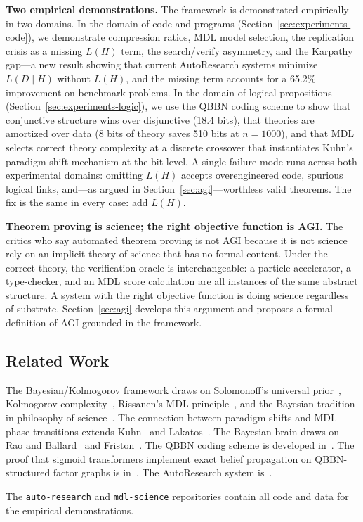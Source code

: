 \textbf{Two empirical demonstrations.} The framework is demonstrated
empirically in two domains. In the domain of code and programs
(Section~\ref{sec:experiments-code}), we demonstrate compression
ratios, MDL model selection, the replication crisis as a missing
$L(H)$ term, the search/verify asymmetry, and the Karpathy gap---a
new result showing that current AutoResearch systems minimize
$L(D \mid H)$ without $L(H)$, and the missing term accounts for a
65.2\% improvement on benchmark problems. In the domain of logical
propositions (Section~\ref{sec:experiments-logic}), we use the QBBN
coding scheme to show that conjunctive structure wins over disjunctive
(18.4 bits), that theories are amortized over data (8 bits of theory
saves 510 bits at $n = 1000$), and that MDL selects correct theory
complexity at a discrete crossover that instantiates Kuhn's paradigm
shift mechanism at the bit level. A single failure mode runs across
both experimental domains: omitting $L(H)$ accepts overengineered
code, spurious logical links, and---as argued in
Section~\ref{sec:agi}---worthless valid theorems. The fix is the same
in every case: add $L(H)$.

\textbf{Theorem proving is science; the right objective function is
AGI.} The critics who say automated theorem proving is not AGI because
it is not science rely on an implicit theory of science that has no
formal content. Under the correct theory, the verification oracle is
interchangeable: a particle accelerator, a type-checker, and an MDL
score calculation are all instances of the same abstract structure.
A system with the right objective function is doing science regardless
of substrate. Section~\ref{sec:agi} develops this argument and
proposes a formal definition of AGI grounded in the framework.

\subsection*{Related Work}

The Bayesian/Kolmogorov framework draws on Solomonoff's universal
prior~\cite{solomonoff1964}, Kolmogorov complexity~\cite{kolmogorov1965},
Rissanen's MDL principle~\cite{rissanen1978}, and the Bayesian
tradition in philosophy of science~\cite{howson2006}. The connection
between paradigm shifts and MDL phase transitions extends
Kuhn~\cite{kuhn1962} and Lakatos~\cite{lakatos1978}. The Bayesian
brain draws on Rao and Ballard~\cite{rao1999} and
Friston~\cite{friston2005}. The QBBN coding scheme is developed
in~\cite{coppola2024qbbn}. The proof that sigmoid transformers
implement exact belief propagation on QBBN-structured factor graphs
is in~\cite{coppola2026}. The AutoResearch system
is~\cite{karpathy2026}.

The \texttt{auto-research} and \texttt{mdl-science} repositories
contain all code and data for the empirical demonstrations.